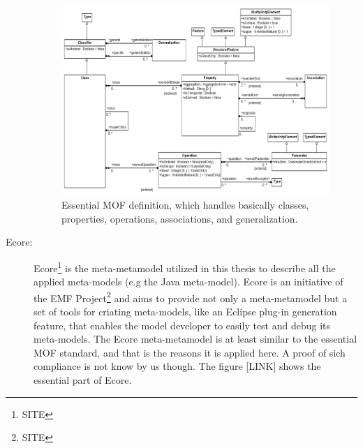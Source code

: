 \documentclass[tuberlin,cic,tc,openright,english,noabntcite]{iiufrgs}
\begin{document}
\begin{description}
\begin{figure}[h]
    \caption{Essential MOF definition, which handles basically classes, properties, operations, associations, and generalization.}
    \begin{center}
        \includegraphics[width=35em]{emof_classes}   
    \end{center}
    \label{fig:emof_classes}
\end{figure}

\item[Ecore:] Ecore\footnote{SITE} is the meta-metamodel utilized in this thesis to describe all the applied meta-models (e.g the Java meta-model). Ecore is an initiative of the EMF Project\footnote{SITE} and aims to provide not only a meta-metamodel but a set of tools for criating meta-models, like an Eclipse plug-in generation feature, that enables the model developer to easily test and debug its meta-models. The Ecore meta-metamodel is at least similar to the essential MOF standard, and that is the reasons it is applied here. A proof of sich compliance is not know by us though. The figure [LINK] shows the essential part of Ecore.



\end{description}
\end{document}
